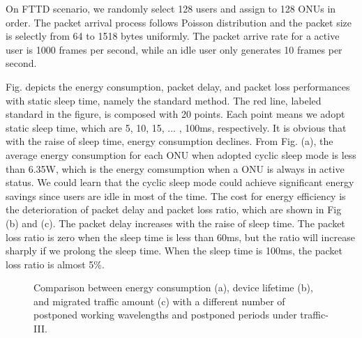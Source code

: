 \documentclass[journal]{IEEEtran}
\begin{document}
On FTTD scenario, we randomly select 128 users and assign to 128 ONUs in order. The packet arrival process follows Poisson distribution and the packet size is selectly from 64 to 1518 bytes uniformly. The packet arrive rate for a active user is 1000 frames per second, while an idle user only generates 10 frames per second. 

Fig. depicts the energy consumption, packet delay, and packet loss performances with static sleep time, namely the standard method. The red line, labeled standard in the figure, is composed with 20 points. Each point means we adopt static sleep time, which are 5, 10, 15, ... , 100ms, respectively. It is obvious that with the raise of sleep time, energy consumption declines. From Fig. (a), the average energy consumption for each ONU when adopted cyclic sleep mode is less than 6.35W, which is the energy comsumption when a ONU is always in active status. We could learn that the cyclic sleep mode could achieve significant energy savings since users are idle in most of the time. The cost for energy efficiency is the deterioration of packet delay and packet loss ratio, which are shown in Fig (b) and (c). The packet delay increases with the raise of sleep time. The packet loss ratio is zero when the sleep time is less than 60ms, but the ratio will increase sharply if we prolong the sleep time. When the sleep time is 100ms, the packet loss ratio is almost 5\%.

\begin{figure*}[!t]
    \centering 
    \caption{Comparison between energy consumption (a), device lifetime (b), and migrated traffic amount (c) with a different number of postponed working wavelengths and postponed periods under traffic-III.} 
    \label{predict} 
\end{figure*}
\end{document}
